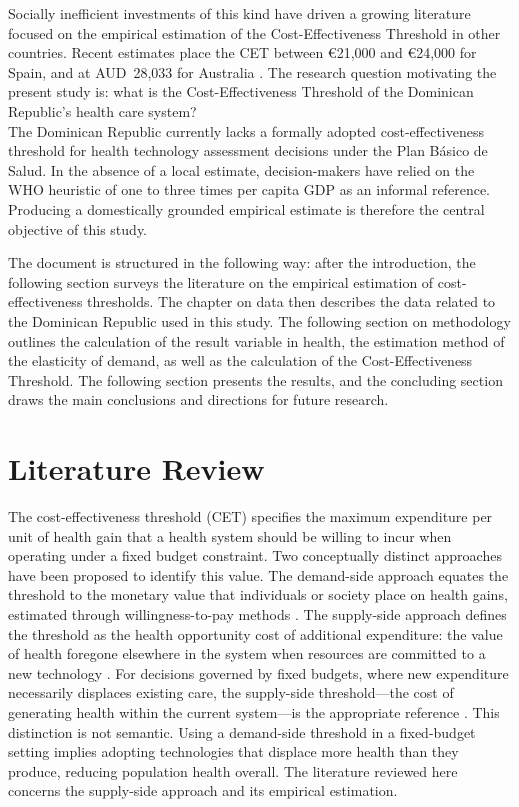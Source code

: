\documentclass[11pt]{article}
\numberwithin{equation}{section}
\theoremstyle{remark}
\begin{document}
Socially inefficient investments of this kind have driven a growing literature focused on the empirical estimation of the Cost-Effectiveness Threshold in other countries. Recent estimates place the CET between \euro{}21,000 and \euro{}24,000 for Spain, and at AUD~28,033 for Australia \parencite{Vallejo2018, Edney2018}. The research question motivating the present study is: what is the Cost-Effectiveness Threshold of the Dominican Republic's health care system? \\

The Dominican Republic currently lacks a formally adopted cost-effectiveness threshold for health technology assessment decisions under the Plan Básico de Salud. In the absence of a local estimate, decision-makers have relied on the WHO heuristic of one to three times per capita GDP as an informal reference. Producing a domestically grounded empirical estimate is therefore the central objective of this study.

The document is structured in the following way: after the introduction, the following section surveys the literature on the empirical estimation of cost-effectiveness thresholds. The chapter on data then describes the data related to the Dominican Republic used in this study. The following section on methodology outlines the calculation of the result variable in health, the estimation method of the elasticity of demand, as well as the calculation of the Cost-Effectiveness Threshold. The following section presents the results, and the concluding section draws the main conclusions and directions for future research.

\section{Literature Review}

The cost-effectiveness threshold (CET) specifies the maximum expenditure per unit of health gain that a health system should be willing to incur when operating under a fixed budget constraint. Two conceptually distinct approaches have been proposed to identify this value. The demand-side approach equates the threshold to the monetary value that individuals or society place on health gains, estimated through willingness-to-pay methods \parencite{Pandey2018}. The supply-side approach defines the threshold as the health opportunity cost of additional expenditure: the value of health foregone elsewhere in the system when resources are committed to a new technology \parencite{Culyer2016}. For decisions governed by fixed budgets, where new expenditure necessarily displaces existing care, the supply-side threshold---the cost of generating health within the current system---is the appropriate reference \parencite{Claxton2015}. This distinction is not semantic. Using a demand-side threshold in a fixed-budget setting implies adopting technologies that displace more health than they produce, reducing population health overall. The literature reviewed here concerns the supply-side approach and its empirical estimation.
\end{document}
